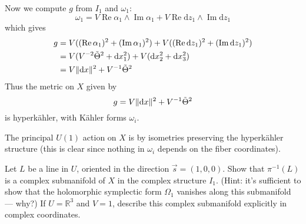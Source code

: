 \documentclass[12pt,letterpaper,reqno]{article}
\numberwithin{equation}{section}
\newcommand{\R}{\ensuremath{\mathbb R}}
\newcommand{\kahler}{K\"ahler\xspace}
\newcommand{\hk}{hyperk\"ahler\xspace}
\newcommand{\de}{\mathrm{d}}
\newcommand{\norm}[1]{\lVert#1\rVert}
\DeclareMathOperator{\im}{Im}
\DeclareMathOperator{\re}{Re}
\begin{document}
\begin{example}
Now we compute $g$ from $I_1$ and $\omega_1$:
\begin{equation}
  \omega_1 = V \re \alpha_1 \wedge \im \alpha_1 + V \re \de z_1 \wedge \im \de z_1
\end{equation}
which gives
\begin{align}
  g &= V ((\re \alpha_1)^2 + (\im \alpha_1)^2) + V ((\re \de z_1)^2 + (\im \de z_1)^2) \\
  &= V (V^{-2} \tTheta^2 + \de x_1^2) + V (\de x_2^2 + \de x_3^2) \\
  &= V \norm{\de x}^2 + V^{-1} \tTheta^2
\end{align}
Thus the metric on $X$ given by
\begin{equation} \label{eq:gibbons-hawking-metric}
  g = V \norm{\de x}^2 + V^{-1} \tTheta^2
\end{equation}
is \hk, with \kahler forms $\omega_i$.

The principal $U(1)$ action on $X$ is by isometries preserving
the \hk structure (this is clear since nothing in $\omega_i$
depends on the fiber coordinates).
\end{example}

\begin{exercise} \label{exc:preimages-of-lines} 
Let $L$ be a line in $U$, oriented 
in the direction $\vec s = (1,0,0)$. 
Show that $\pi^{-1}(L)$ is a complex submanifold of $X$
in the complex structure $I_1$. (Hint: it's sufficient
to show that the holomorphic symplectic form $\Omega_1$ vanishes
along this submanifold --- why?) If $U = \R^3$ and $V=1$,
describe this complex submanifold explicitly in complex coordinates. 
\end{exercise}
\end{document}
